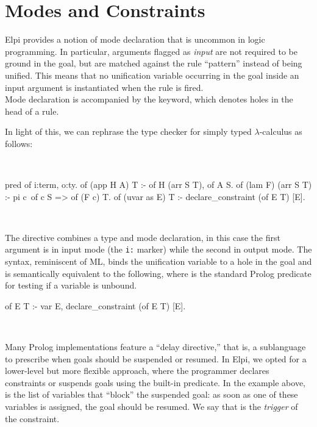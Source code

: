 \documentclass[a4paper, 11pt]{book}
\newenvironment{elpicode}
  {\VerbatimEnvironment~\\\begin{elpibox}\begin{xelpicode}}{\end{xelpicode}
\end{elpibox}\\}
\begin{document}
\section{Modes and Constraints}\label{sec:modes}


Elpi provides a notion of mode declaration that is uncommon in logic
programming. In particular, arguments flagged as \emph{input} are not required to be
ground in the goal, but are matched against the rule ``pattern'' instead of
being unified. This means that no unification variable occurring in the goal
inside an input argument is instantiated when the rule is fired.
~\\

Mode declaration is accompanied by the  keyword, which denotes
holes in the head of a rule.

In light of this, we can rephrase the type checker for simply typed
$\lambda$-calculus as follows:

\begin{elpicode}
pred of i:term, o:ty.
of (app H A) T :- of H (arr S T), of A S.
of (lam F) (arr S T) :- pi c\ of c S => of (F c) T.
of (uvar as E) T :- declare_constraint (of E T) [E].
\end{elpicode}

The  directive combines a type and mode declaration,
in this case the first argument is in input mode (the \texttt{i:} marker)
while the second in output mode.
The  syntax, reminiscent of ML,
binds the unification variable  to a hole in the
goal and is semantically equivalent to the following, where  is
the standard Prolog predicate for testing if a variable is unbound.
\begin{elpicode}
of E T :- var E, declare_constraint (of E T) [E].
\end{elpicode}

Many Prolog implementations feature a ``delay directive,'' that is, a
sublanguage to prescribe when goals should be suspended or resumed. In Elpi,
we opted for a lower-level but more flexible approach, where the programmer
declares constraints or suspends goals using the 
built-in predicate. In the example above, \elpi{[E]} is the list of variables
that ``block'' the suspended goal: as soon as one of these variables is
assigned, the goal should be resumed. We say that  is the \emph{trigger} of
the constraint.
\end{document}
